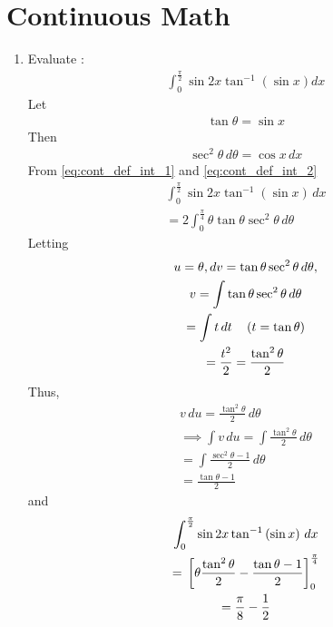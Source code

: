 \documentclass[journal,12pt,twocolumn]{IEEEtran}
\renewcommand\thesection{\arabic{section}}
\begin{document}
\section{Continuous Math}
\begin{enumerate}[label=\thesection.\arabic*.,ref=\thesection.\theenumi]
 \item Evaluate : \begin{align} \int_{0}^{\frac{\pi}{2}} \sin2x \tan^{-1}  \left(\sin x\right)dx \nonumber \end{align}
		 \solution Let 
		 \begin{align}
			 \label{eq:cont_def_int_1}
			 \tan \theta = \sin x
		 \end{align}
		 Then 
		 \begin{align}
			 \label{eq:cont_def_int_2}
			 \sec^2  \theta \, d\theta= \cos x \, dx
		 \end{align}
			 From \eqref{eq:cont_def_int_1} and 
			 \eqref{eq:cont_def_int_2}
 \begin{multline} 
 \int_{0}^{\frac{\pi}{2}} \sin2x \tan^{-1}  \left(\sin x\right)\, dx  
 \\
	 =
2 \int_{0}^{\frac{\pi}{4}}  \theta \tan \theta \sec^2\theta \, d\theta
 \end{multline}
 Letting 
 \begin{multline} 
	 u = \theta , dv = \tan \theta \sec^2\theta \, d\theta, 
	 \\
	 v = \int \tan \theta \sec^2\theta \, d\theta 
	 \\
	  = \int t \, dt \quad \left(t = \tan \theta \right)
	  \\
	  = \frac{t^2}{2} = \frac{\tan^2 \theta }{2}
 \end{multline}
 Thus, 
 \begin{multline} 
v\,du 
	 =   \frac{\tan^2\theta }{2}\, d\theta
	 \\
	 \implies \int v\, du = \int \frac{\tan^2\theta }{2}\, d\theta
	 \\
	 = \int \frac{\sec^2\theta -1 }{2}\, d\theta
	 \\
	 =  \frac{\tan \theta - 1}{2}
 \end{multline}
 and
 \begin{multline} 
 \int_{0}^{\frac{\pi}{2}} \sin2x \tan^{-1}  \left(\sin x\right)\, dx  
 \\
	 = {}\left[\theta \frac{\tan^2\theta}{2} -  \frac{\tan \theta - 1}{2} \right]_{0}^{\frac{\pi}{4}}
	 \\
	 = \frac{\pi}{8} - \frac{1}{2}
 \end{multline}


\end{enumerate}
\end{document}
